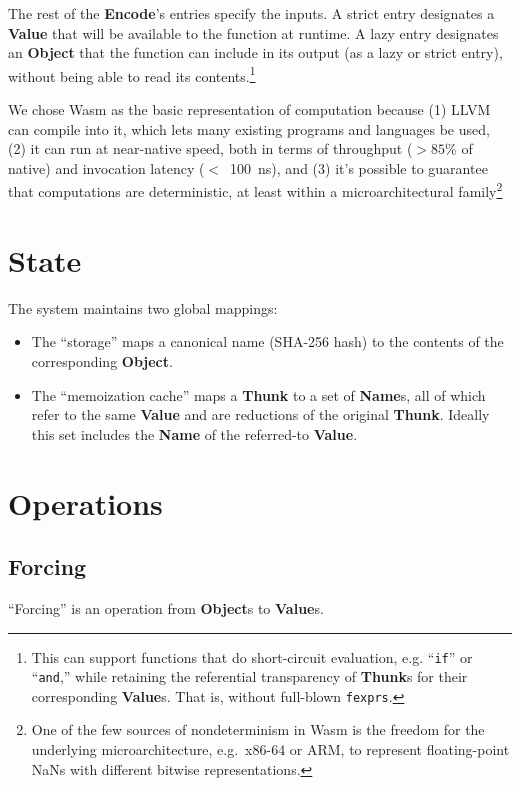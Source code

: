 \documentclass{article}
\newcommand{\valuex}{\textbf{Value}\xspace}
\newcommand{\valuexs}{\textbf{Value}s\xspace}
\newcommand{\object}{\textbf{Object}\xspace}
\newcommand{\objects}{\textbf{Object}s\xspace}
\newcommand{\encode}{\textbf{Encode}\xspace}
\newcommand{\thunk}{\textbf{Thunk}\xspace}
\newcommand{\thunks}{\textbf{Thunk}s\xspace}
\newcommand{\name}{\textbf{Name}\xspace}
\newcommand{\names}{\textbf{Name}s\xspace}
\newcommand{\bs}{\vspace{\baselineskip}}
\begin{document}
The rest of the \encode's entries specify the inputs. A strict entry
designates a \valuex that will be available to the function at
runtime. A lazy entry designates an \object that the function can
include in its output (as a lazy or strict entry), without being able
to read its contents.\footnote{This can support functions that do
short-circuit evaluation, e.g. ``\texttt{if}'' or ``\texttt{and},''
while retaining the referential transparency of \thunks for their corresponding \valuexs. That
is, without full-blown \texttt{fexprs}.}

\bs

We chose Wasm as the basic representation of computation because (1)
LLVM can compile into it, which lets many existing programs and
languages be used, (2) it can run at near-native speed, both in terms
of throughput ($>85\%$ of native) and invocation latency ($<$~100~ns),
and (3) it's possible to guarantee that computations are
deterministic, at least within a microarchitectural
family\footnote{One of the few sources of nondeterminism in Wasm is
the freedom for the underlying microarchitecture, e.g.~x86-64 or ARM, to represent floating-point NaNs
with different bitwise representations.}

\section{State}

The system maintains two global mappings:
\begin{itemize}[topsep=0pt, itemsep=0pt]
\item The ``storage'' maps a canonical name (SHA-256 hash) to the contents of the corresponding \object.

\item The ``memoization cache'' maps a \thunk to a set of \names, all
  of which refer to the same \valuex and are reductions of the
  original \thunk. Ideally this set includes the \name of the
  referred-to \valuex.
\end{itemize}
  
\section{Operations}

\subsection{Forcing}

``Forcing'' is an operation from \objects to \valuexs.
\end{document}
